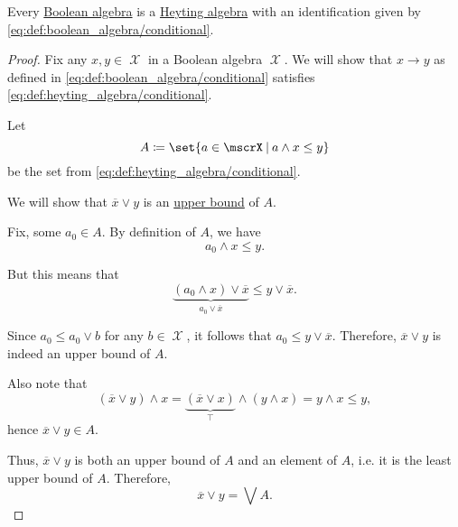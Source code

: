 \begin{proposition}\label{thm:boolean_algebras_are_heyting_algebras}
  Every \hyperref[def:boolean_algebra]{Boolean algebra} is a \hyperref[def:heyting_algebra]{Heyting algebra} with an identification given by \eqref{eq:def:boolean_algebra/conditional}.
\end{proposition}
\begin{proof}
  Fix any \( x, y \in \mscrX \) in a Boolean algebra \( \mscrX \). We will show that \( x \rightarrow y \) as defined in \eqref{eq:def:boolean_algebra/conditional} satisfies \eqref{eq:def:heyting_algebra/conditional}.

  Let
  \begin{equation*}
   A \coloneqq \set{ a \in \mscrX \given a \wedge x \leq y }
  \end{equation*}
  be the set from \eqref{eq:def:heyting_algebra/conditional}.

  We will show that \( \overline x \vee y \) is an \hyperref[def:partially_ordered_set_extremal_points/upper_and_lower_bounds]{upper bound} of \( A \).

  Fix, some \( a_0 \in A \). By definition of \( A \), we have
  \begin{equation*}
   a_0 \wedge x \leq y.
  \end{equation*}

  But this means that
  \begin{equation*}
   \underbrace{(a_0 \wedge x) \vee \overline x}_{a_0 \vee \overline x} \leq y \vee \overline x.
  \end{equation*}

  Since \( a_0 \leq a_0 \vee b \) for any \( b \in \mscrX \), it follows that \( a_0 \leq y \vee \overline x \). Therefore, \( \overline x \vee y \) is indeed an upper bound of \( A \).

  Also note that
  \begin{equation*}
   (\overline x \vee y) \wedge x = \underbrace{(\overline x \vee x)}_{\top} \wedge (y \wedge x) = y \wedge x \leq y,
  \end{equation*}
  hence \( \overline x \vee y \in A \).

  Thus, \( \overline x \vee y \) is both an upper bound of \( A \) and an element of \( A \), i.e. it is the least upper bound of \( A \). Therefore,
  \begin{equation*}
   \overline x \vee y = \bigvee A.
  \end{equation*}
\end{proof}

